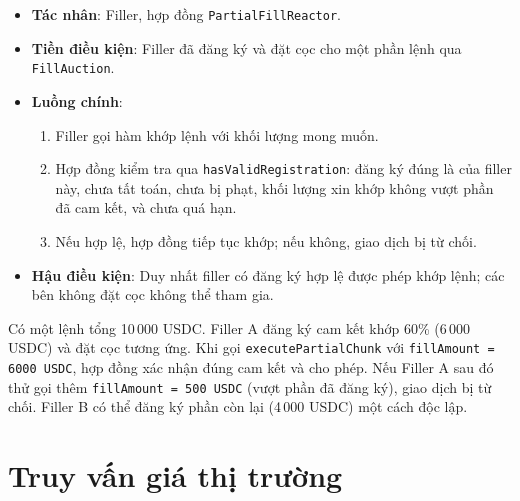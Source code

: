 \documentclass[../DoAn.tex]{subfiles}
\begin{document}
\begin{itemize}
    \item \textbf{Tác nhân}: Filler, hợp đồng \texttt{PartialFillReactor}.
    \item \textbf{Tiền điều kiện}: Filler đã đăng ký và đặt cọc cho một phần lệnh qua \texttt{FillAuction}.
    \item \textbf{Luồng chính}:
    \begin{enumerate}
        \item Filler gọi hàm khớp lệnh với khối lượng mong muốn.
        \item Hợp đồng kiểm tra qua \texttt{hasValidRegistration}: đăng ký đúng là của filler này, chưa tất toán, chưa bị phạt, khối lượng xin khớp không vượt phần đã cam kết, và chưa quá hạn.
        \item Nếu hợp lệ, hợp đồng tiếp tục khớp; nếu không, giao dịch bị từ chối.
    \end{enumerate}
    \item \textbf{Hậu điều kiện}: Duy nhất filler có đăng ký hợp lệ được phép khớp lệnh; các bên không đặt cọc không thể tham gia.
\end{itemize}

\begin{example}
Có một lệnh tổng 10\,000 USDC. Filler A đăng ký cam kết khớp 60\% (6\,000 USDC) và đặt cọc tương ứng. Khi gọi \texttt{executePartialChunk} với \texttt{fillAmount = 6000 USDC}, hợp đồng xác nhận đúng cam kết và cho phép. Nếu Filler A sau đó thử gọi thêm \texttt{fillAmount = 500 USDC} (vượt phần đã đăng ký), giao dịch bị từ chối. Filler B có thể đăng ký phần còn lại (4\,000 USDC) một cách độc lập.
\end{example}

\section{Truy vấn giá thị trường}
\end{document}
